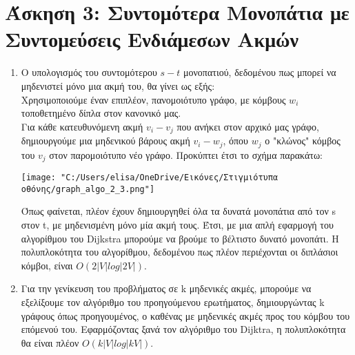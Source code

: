 \documentclass{article}
\begin{document}
\section*{\large Άσκηση 3: Συντομότερα Μονοπάτια με Συντομεύσεις Ενδιάμεσων Ακμών} 
\begin{enumerate}
\item Ο υπολογισμός του συντομότερου $s-t$ μονοπατιού, δεδομένου πως μπορεί να μηδενιστεί μόνο μια ακμή του, θα γίνει ως εξής:\\
Χρησιμοποιούμε έναν επιπλέον, πανομοιότυπο γράφο, με κόμβους $w_i$ τοποθετημένο δίπλα στον κανονικό μας. \\
Για κάθε κατευθυνόμενη ακμή $v_i - v_j$ που ανήκει στον αρχικό μας γράφο, δημιουργούμε μια μηδενικού βάρους ακμή $v_i - w_j$, όπου $w_j$ ο "κλώνος" κόμβος του $v_j$ στον παρομοιότυπο νέο γράφο. Προκύπτει έτσι το σχήμα παρακάτω: 

\begin{minipage}{\textwidth}
 \centering
 \texttt{[image: "C:/Users/elisa/OneDrive/Εικόνες/Στιγμιότυπα οθόνης/graph\_algo\_2\_3.png"]}
\end{minipage}

Όπως φαίνεται, πλέον έχουν δημιουργηθεί όλα τα δυνατά μονοπάτια από τον s στον t, με μηδενισμένη μόνο μία ακμή τους. Έτσι, με μια απλή εφαρμογή του αλγορίθμου του Dijkstra μπορούμε να βρούμε το βέλτιστο δυνατό μονοπάτι. Η πολυπλοκότητα του αλγορίθμου, δεδομένου πως πλέον περιέχονται οι διπλάσιοι κόμβοι, είναι $O(2|V|log|2V|)$. 

\item Για την γενίκευση του προβλήματος σε k μηδενικές ακμές, μπορούμε να εξελίξουμε τον αλγόριθμο του προηγούμενου ερωτήματος, δημιουργώντας k γράφους όπως προηγουμένος, ο καθένας με μηδενικές ακμές προς του κόμβου του επόμενού του. Εφαρμόζοντας ξανά τον αλγόριθμο του Dijktra, η πολυπλοκότητα θα είναι πλέον $O(k|V|log|kV|)$.
\end{enumerate}
\end{document}
